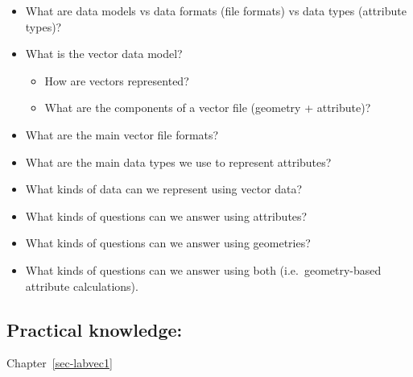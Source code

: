 \documentclass[
  letterpaper,
  DIV=11,
  numbers=noendperiod]{scrreprt}
\providecommand{\tightlist}{%
  \setlength{\itemsep}{0pt}\setlength{\parskip}{0pt}}\usepackage{longtable,booktabs,array}
\begin{document}
\begin{itemize}
\tightlist
\item
  What are data models vs data formats (file formats) vs data types
  (attribute types)?
\item
  What is the vector data model?

  \begin{itemize}
  \tightlist
  \item
    How are vectors represented?
  \item
    What are the components of a vector file (geometry + attribute)?
  \end{itemize}
\item
  What are the main vector file formats?
\item
  What are the main data types we use to represent attributes?
\item
  What kinds of data can we represent using vector data?
\item
  What kinds of questions can we answer using attributes?
\item
  What kinds of questions can we answer using geometries?
\item
  What kinds of questions can we answer using both (i.e.~geometry-based
  attribute calculations).
\end{itemize}

\subsection*{Practical knowledge:}\label{practical-knowledge-1}

Chapter~\ref{sec-labvec1}
\end{document}
